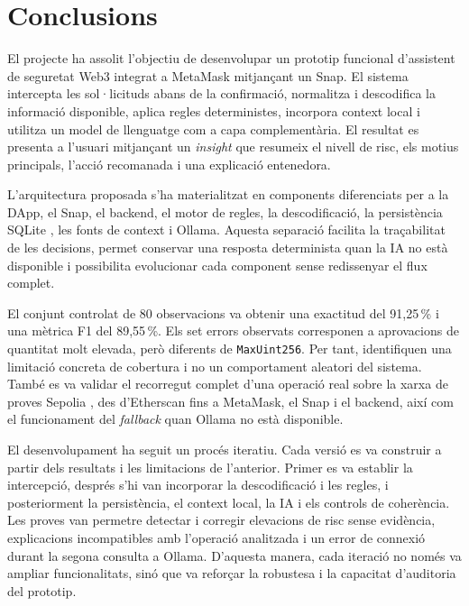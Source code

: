 \section{Conclusions}
\label{cap:conclusions}

El projecte ha assolit l'objectiu de desenvolupar un prototip funcional d'assistent de seguretat Web3 integrat a MetaMask mitjançant un Snap. El sistema intercepta les sol·licituds abans de la confirmació, normalitza i descodifica la informació disponible, aplica regles deterministes, incorpora context local i utilitza un model de llenguatge com a capa complementària. El resultat es presenta a l'usuari mitjançant un \textit{insight} que resumeix el nivell de risc, els motius principals, l'acció recomanada i una explicació entenedora.

L'arquitectura proposada s'ha materialitzat en components diferenciats per a la DApp, el Snap, el backend, el motor de regles, la descodificació, la persistència SQLite \cite{sqlite_docs}, les fonts de context i Ollama. Aquesta separació facilita la traçabilitat de les decisions, permet conservar una resposta determinista quan la IA no està disponible i possibilita evolucionar cada component sense redissenyar el flux complet.

El conjunt controlat de 80 observacions va obtenir una exactitud del 91,25\,\% i una mètrica F1 del 89,55\,\%. Els set errors observats corresponen a aprovacions de quantitat molt elevada, però diferents de \texttt{MaxUint256}. Per tant, identifiquen una limitació concreta de cobertura i no un comportament aleatori del sistema. També es va validar el recorregut complet d'una operació real sobre la xarxa de proves Sepolia \cite{ethereum_sepolia}, des d'Etherscan fins a MetaMask, el Snap i el backend, així com el funcionament del \textit{fallback} quan Ollama no està disponible.

El desenvolupament ha seguit un procés iteratiu. Cada versió es va construir a partir dels resultats i les limitacions de l'anterior. Primer es va establir la intercepció, després s'hi van incorporar la descodificació i les regles, i posteriorment la persistència, el context local, la IA i els controls de coherència. Les proves van permetre detectar i corregir elevacions de risc sense evidència, explicacions incompatibles amb l'operació analitzada i un error de connexió durant la segona consulta a Ollama. D'aquesta manera, cada iteració no només va ampliar funcionalitats, sinó que va reforçar la robustesa i la capacitat d'auditoria del prototip.

